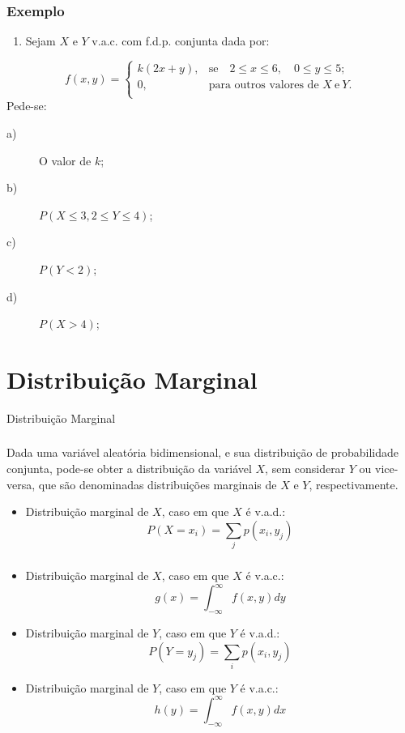 \documentclass[14pt,aspectratio=1610]{beamer}
\begin{document}
\begin{frame}{}
\frametitle{Exemplo}
\begin{block}{}
\begin{enumerate}
\item Sejam $X$ e $Y$ v.a.c. com f.d.p. conjunta dada por:
\end{enumerate}
$$
f(x,y)=\left\{
\begin{array}{ccc}
k(2x+y),& \textrm{se}\quad 2\leq x\leq 6,\quad 0\leq y\leq 5;\\
0,& \textrm{para outros valores de\ }X\ \textrm{e}\ Y.\\
\end{array}
\right.
$$
Pede-se:
\begin{description}
\item[a)] O valor de $k$;
\item[b)] $P(X\leq 3, 2\leq Y \leq 4)$;
\item[c)] $P(Y<2)$;
\item[d)] $P(X>4)$;
\end{description}
\end{block}
\end{frame}

\section{Distribuição Marginal}
\begin{frame}{Distribuição Marginal}
\frametitle{}
\begin{block}{}
\justifying
Dada uma variável aleatória bidimensional, e sua distribuição de probabilidade conjunta, pode-se obter a distribuição da variável $X$, sem considerar $Y$ ou vice-versa, 
que são denominadas distribuições marginais de $X$ e $Y$, respectivamente.

\begin{itemize}
\item Distribuição marginal de $X$, caso em que $X$ é v.a.d.:
$$\displaystyle P(X=x_{i})=\sum_{j}p(x_{i},y_{j})$$
\end{itemize}
\end{block}
\end{frame}

\begin{frame}{}
\frametitle{}
\begin{block}{}
\begin{itemize}
\item Distribuição marginal de $X$, caso em que $X$ é v.a.c.:
$$\displaystyle g(x)=\int_{-\infty}^{\infty} f(x,y)dy$$\pause
\vspace{-0.5cm}
\item Distribuição marginal de $Y$, caso em que $Y$ é v.a.d.:
$$\displaystyle P(Y=y_{j})=\sum_{i}p(x_{i},y_{j})$$\pause
\vspace{-0.5cm}
\item Distribuição marginal de $Y$, caso em que $Y$ é v.a.c.:
$$\displaystyle h(y)=\int_{-\infty}^{\infty} f(x,y)dx$$
\end{itemize}
\end{block}
\end{frame}
\end{document}

